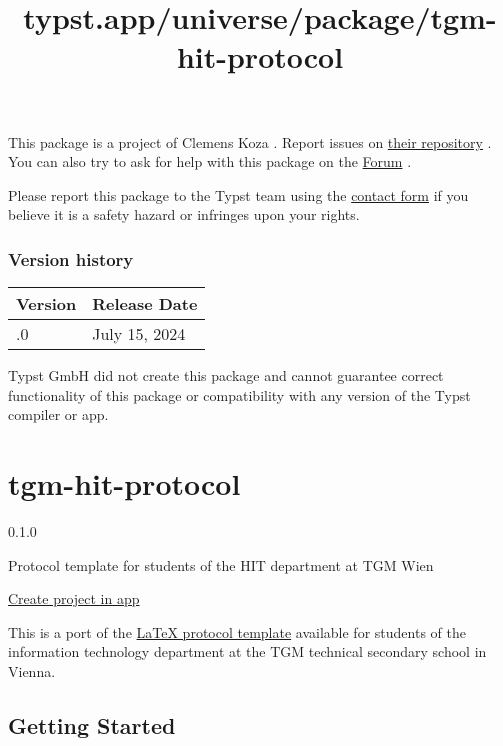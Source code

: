 This package is a project of Clemens Koza . Report issues on
\href{https://github.com/SillyFreak/typst-stack-pointer}{their
repository} . You can also try to ask for help with this package on the
\href{https://forum.typst.app}{Forum} .

Please report this package to the Typst team using the
\href{https://typst.app/contact}{contact form} if you believe it is a
safety hazard or infringes upon your rights.

\label{versions}
\subsubsection{Version history}\label{version-history}

\begin{longtable}[]{@{}ll@{}}
\toprule\noalign{}
Version & Release Date \\
\midrule\noalign{}
\endhead
\bottomrule\noalign{}
\endlastfoot
0.1.0 & July 15, 2024 \\
\end{longtable}

Typst GmbH did not create this package and cannot guarantee correct
functionality of this package or compatibility with any version of the
Typst compiler or app.


\title{typst.app/universe/package/tgm-hit-protocol}

\label{banner}
\label{template-thumbnail}

\section{tgm-hit-protocol}\label{tgm-hit-protocol}

{ 0.1.0 }

Protocol template for students of the HIT department at TGM Wien

\href{/app?template=tgm-hit-protocol&version=0.1.0}{Create project in
app}

\label{readme}
This is a port of the
\href{https://github.com/TGM-HIT/latex-protocol/}{LaTeX protocol
template} available for students of the information technology
department at the TGM technical secondary school in Vienna.

\subsection{Getting Started}\label{getting-started}

